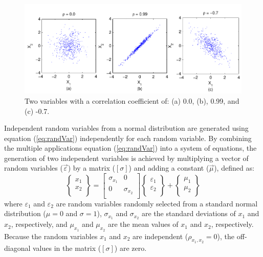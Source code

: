 \documentclass[11pt]{report}
\begin{document}
\begin{figure}[tb]
  \begin{center}
	\includegraphics[width=\textwidth]{figures/rand/correlation.pdf}
  \end{center}
  \caption{Two variables with a correlation coefficient of: (a) 0.0, (b), 0.99, and (c) -0.7.}
  \label{fig:rand:correl}
\end{figure}

Independent random variables from a normal distribution are generated using equation
(\ref{eq:randVar}) independently for each random variable. By combining the multiple applications
equation (\ref{eq:randVar}) into a system of equations, the generation of two independent variables
is achieved by multiplying a vector of random variables ($\vec{\varepsilon}$) by a matrix
($[\sigma]$) and adding a constant ($\vec{\mu}$), defined as:
\begin{equation}
  \left\{
  \begin{array}{c}
	x_1 \\
	x_2 \\
  \end{array}
  \right\} 
  =
  \left[
  \begin{array}{ccc}
	\sigma_{x_1} & 0 \\
	0 & \sigma_{x_2} \\
  \end{array}
  \right]
  \left\{
  \begin{array}{c}
	\varepsilon_1 \\
	\varepsilon_2 \\
  \end{array}
  \right\}
  + 
  \left\{
  \begin{array}{c}
	\mu_1 \\
	\mu_2 \\
  \end{array}
  \right\}
  \label{eq:linearSystem:uncorrel}
\end{equation}
where $\varepsilon_1$ and $\varepsilon_2$ are random variables randomly selected from a standard
normal distribution ($\mu=0$ and $\sigma=1$), $\sigma_{x_1}$ and $\sigma_{x_2}$ are the standard
deviations of $x_1$ and $x_2$, respectively, and $\mu_{x_1}$ and $\mu_{x_2}$ are the mean values of
$x_1$ and $x_2$, respectively.  Because the random variables $x_1$ and $x_2$ are independent
($\rho_{x_1,x_2}=0$), the off-diagonal values in the matrix ($[\sigma]$) are zero.  
\end{document}
